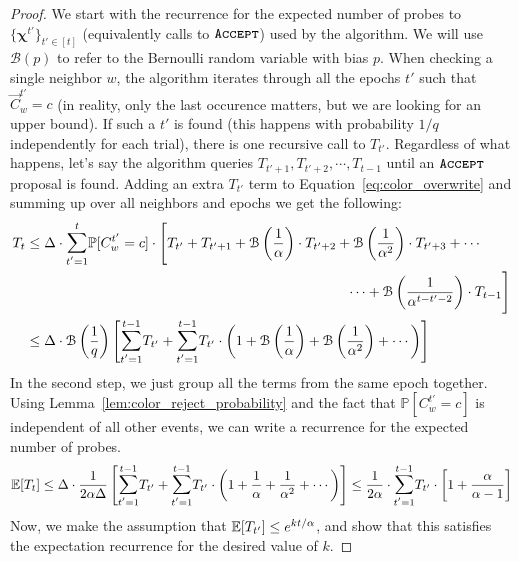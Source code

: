 \begin{proof}
We start with the recurrence for the expected number of probes to $\{\bm\chi^{t'}\}_{t'\in[t]}$
(equivalently calls to $\texttt{\textsc{Accept}}$) used by the algorithm.
We will use $\mathcal B(p)$ to refer to the Bernoulli random variable with bias $p$.
When checking a single neighbor $w$, the algorithm iterates through all the epochs $t'$ such that $\vec C^{t'}_w = c$
(in reality, only the last occurence matters, but we are looking for an upper bound).
If such a $t'$ is found (this happens with probability $1/q$ independently for each trial), there is one recursive call to $T_{t'}$.
Regardless of what happens, let's say the algorithm queries $T_{t'+1}, T_{t'+2}, \cdots, T_{t-1}$ until an $\texttt{\textsc{Accept}}$ proposal is found.
Adding an extra $T_{t'}$ term to Equation~\ref{eq:color_overwrite} and summing up over all neighbors and epochs we get the following:
\begin{align}
T_{t} &\le \Delta \cdot \mathlarger\sum\limits_{t'=1}^{t} \mathbb P[C^{t'}_w = c]\cdot
\Biggl[ T_{t'} + T_{t'+1} + \mathcal B\left(\frac{1}{\alpha}\right)\cdot T_{t'+2}
+ \mathcal B\left(\frac{1}{\alpha^2}\right)\cdot T_{t'+3} + \cdots\\
&\hspace{23em}
\cdots + \mathcal B\left(\frac{1}{\alpha^{t-t'-2}}\right)\cdot T_{t-1} \Biggr]\\
&\le \Delta\cdot\mathcal B\left( \frac{1}{q}\right) \Biggl[
\mathlarger\sum\limits_{t'=1}^{t-1} T_{t'} +
\mathlarger\sum\limits_{t'=1}^{t-1} T_{t'}\cdot \left(1 + \mathcal B\left(\frac1\alpha\right) + \mathcal B\left(\frac1{\alpha^2}\right) + \cdots\right)
\Biggr]
\end{align}
In the second step, we just group all the terms from the same epoch together.
Using Lemma~\ref{lem:color_reject_probability} and the fact that $\mathbb P[C^{t'}_w = c]$ is independent of all other events,
we can write a recurrence for the expected number of probes.
\begin{align}
\mathbb E[T_t] \le \Delta\cdot\frac{1}{2\alpha\Delta}
\left[
\mathlarger\sum\limits_{t'=1}^{t-1} T_{t'} + \mathlarger\sum\limits_{t'=1}^{t-1} T_{t'}\cdot \left(1 + \frac1\alpha + \frac1{\alpha^2} + \cdots\right)
\right]
\le \frac{1}{2\alpha}\cdot \mathlarger\sum\limits_{t'=1}^{t-1} T_{t'}\cdot \left[1 + \frac{\alpha}{\alpha-1} \right]
\end{align}
Now, we make the assumption that $\mathbb E[T_{t'}]\le e^{k t/\alpha}$,
and show that this satisfies the expectation recurrence for the desired value of $k$.

\end{proof}
